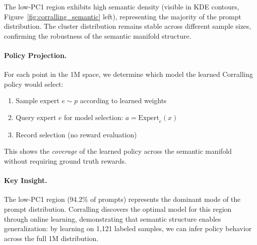 The low-PC1 region exhibits high semantic density (visible in KDE contours, Figure~\ref{fig:corralling_semantic} left), representing the majority of the prompt distribution.
The cluster distribution remains stable across different sample sizes, confirming the robustness of the semantic manifold structure.

\paragraph{Policy Projection.}
For each point in the 1M space, we determine which model the learned Corralling policy would select:
\begin{enumerate}[nosep]
    \item Sample expert $e \sim p$ according to learned weights
    \item Query expert $e$ for model selection: $a = \text{Expert}_e(x)$
    \item Record selection (no reward evaluation)
\end{enumerate}

This shows the \emph{coverage} of the learned policy across the semantic manifold without requiring ground truth rewards.

\paragraph{Key Insight.}
The low-PC1 region (94.2\% of prompts) represents the dominant mode of the prompt distribution.
Corralling discovers the optimal model for this region through online learning, demonstrating that semantic structure enables generalization: by learning on 1,121 labeled samples, we can infer policy behavior across the full 1M distribution.





